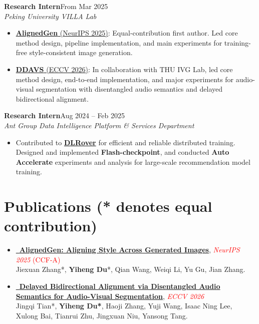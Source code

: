 \documentclass[10pt,a4paper]{article}
\newcommand{\sep}{\hspace{0.6em}{\large$\cdot$}\hspace{0.6em}}
\newcommand{\dateright}[1]{\hfill {\small #1}}
\newcommand{\role}[2]{\textbf{#1}\dateright{#2}}
\newcommand{\org}[1]{\textit{#1}}
\newcommand{\pdficon}{}   %
\begin{document}
\role{Research Intern}{From Mar 2025}\\
\org{Peking University VILLA Lab}
\begin{itemize}
  \item \href{https://arxiv.org/abs/2509.17088}{\textbf{AlignedGen} (NeurIPS 2025)}: Equal-contribution first author. Led core method design, pipeline implementation, and main experiments for training-free style-consistent image generation.
  \item \href{https://arxiv.org/abs/2512.20117}{\textbf{DDAVS} (ECCV 2026)}: In collaboration with THU IVG Lab, led core method design, end-to-end implementation, and major experiments for audio-visual segmentation with disentangled audio semantics and delayed bidirectional alignment.
\end{itemize}

\role{Research Intern}{Aug 2024 -- Feb 2025}\\
\org{Ant Group \sep Data Intelligence Platform \& Services Department}
\begin{itemize}
  \item Contributed to \href{https://github.com/intelligent-machine-learning/dlrover}{\textbf{DLRover}} for efficient and reliable distributed training. Designed and implemented \textbf{Flash-checkpoint}, and conducted \textbf{Auto Accelerate} experiments and analysis for large-scale recommendation model training.
\end{itemize}

\section*{Publications \small (* denotes equal contribution)}


\begin{itemize}
  \item \href{https://arxiv.org/abs/2509.17088}{\pdficon\ \textbf{AlignedGen: Aligning Style Across Generated Images}}, 
  \textcolor{red}{\textit{NeurIPS 2025} (CCF-A)}\\
  Jiexuan Zhang*, \textbf{Yiheng Du}*, Qian Wang, Weiqi Li, Yu Gu, Jian Zhang.
\end{itemize}

\begin{itemize}
  \item \href{https://arxiv.org/abs/2512.20117}{\pdficon\ \textbf{Delayed Bidirectional Alignment via Disentangled Audio Semantics for Audio-Visual Segmentation}}, 
  \textcolor{red}{\textit{ECCV 2026}}\\
  Jingqi Tian*, \textbf{Yiheng Du*}, Haoji Zhang, Yuji Wang, Isaac Ning Lee, Xulong Bai, Tianrui Zhu, Jingxuan Niu, Yansong Tang.
\end{itemize}
\end{document}
